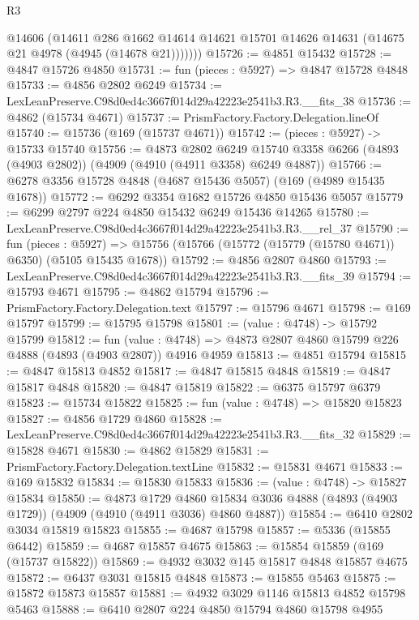 \begin{lexlean}{R3}
\begin{coremodule}
          @14606
          (@14611
            @286
            @1662
            @14614
            @14621
            @15701
            @14626
            @14631
            (@14675 @21 @4978 (@4945 (@14678 @21)))))))
@15726 := @4851 @15432
@15728 := @4847 @15726 @4850
@15731 := fun (pieces : @5927) => @4847 @15728 @4848
@15733 := @4856 @2802 @6249
@15734 := LexLeanPreserve.C98d0ed4c3667f014d29a42223e2541b3.R3.__fits_38
@15736 := @4862 (@15734 @4671)
@15737 := PrismFactory.Factory.Delegation.lineOf
@15740 := @15736 (@169 (@15737 @4671))
@15742 := (pieces : @5927) -> @15733 @15740
@15756 := @4873
    @2802
    @6249
    @15740
    @3358
    @6266
    (@4893 (@4903 @2802))
    (@4909 (@4910 (@4911 @3358) @6249 @4887))
@15766 := @6278 @3356 @15728 @4848 (@4687 @15436 @5057) (@169 (@4989 @15435 @1678))
@15772 := @6292 @3354 @1682 @15726 @4850 @15436 @5057
@15779 := @6299 @2797 @224 @4850 @15432 @6249 @15436 @14265
@15780 := LexLeanPreserve.C98d0ed4c3667f014d29a42223e2541b3.R3.__rel_37
@15790 := fun (pieces : @5927) =>
  @15756 (@15766 (@15772 (@15779 (@15780 @4671)) @6350) (@5105 @15435 @1678))
@15792 := @4856 @2807 @4860
@15793 := LexLeanPreserve.C98d0ed4c3667f014d29a42223e2541b3.R3.__fits_39
@15794 := @15793 @4671
@15795 := @4862 @15794
@15796 := PrismFactory.Factory.Delegation.text
@15797 := @15796 @4671
@15798 := @169 @15797
@15799 := @15795 @15798
@15801 := (value : @4748) -> @15792 @15799
@15812 := fun (value : @4748) =>
  @4873 @2807 @4860 @15799 @226 @4888 (@4893 (@4903 @2807)) @4916 @4959
@15813 := @4851 @15794
@15815 := @4847 @15813 @4852
@15817 := @4847 @15815 @4848
@15819 := @4847 @15817 @4848
@15820 := @4847 @15819
@15822 := @6375 @15797 @6379
@15823 := @15734 @15822
@15825 := fun (value : @4748) => @15820 @15823
@15827 := @4856 @1729 @4860
@15828 := LexLeanPreserve.C98d0ed4c3667f014d29a42223e2541b3.R3.__fits_32
@15829 := @15828 @4671
@15830 := @4862 @15829
@15831 := PrismFactory.Factory.Delegation.textLine
@15832 := @15831 @4671
@15833 := @169 @15832
@15834 := @15830 @15833
@15836 := (value : @4748) -> @15827 @15834
@15850 := @4873
    @1729
    @4860
    @15834
    @3036
    @4888
    (@4893 (@4903 @1729))
    (@4909 (@4910 (@4911 @3036) @4860 @4887))
@15854 := @6410 @2802 @3034 @15819 @15823
@15855 := @4687 @15798
@15857 := @5336 (@15855 @6442)
@15859 := @4687 @15857 @4675
@15863 := @15854 @15859 (@169 (@15737 @15822))
@15869 := @4932 @3032 @145 @15817 @4848 @15857 @4675
@15872 := @6437 @3031 @15815 @4848
@15873 := @15855 @5463
@15875 := @15872 @15873 @15857
@15881 := @4932 @3029 @1146 @15813 @4852 @15798 @5463
@15888 := @6410 @2807 @224 @4850 @15794 @4860 @15798 @4955

\end{coremodule}
\end{lexlean}
